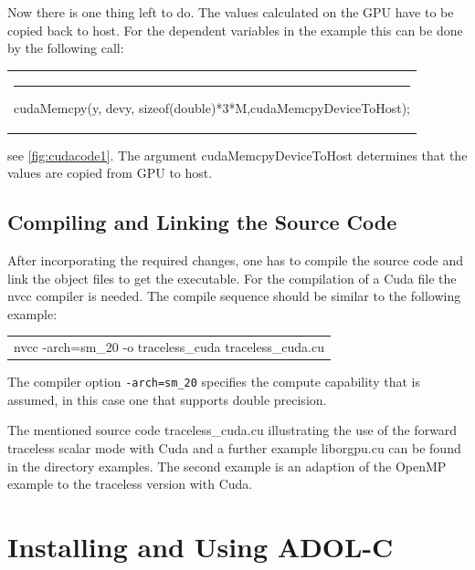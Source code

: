 \documentclass[11pt,twoside]{article}
\begin{document}
Now there is one thing left to do. The values calculated on the GPU have to be copied 
back to host. For the dependent variables in the example this can be done by the 
following call:
\begin{center}
  \begin{tabular}{l}
 {\sf \rule{0.5cm}{0pt}cudaMemcpy(y, devy, sizeof(double)*3*M,cudaMemcpyDeviceToHost);}\\
  \end{tabular}
\end{center} 
see \autoref{fig:cudacode1}. The argument {\sf cudaMemcpyDeviceToHost} determines that
the values are copied from GPU to host.

%
\subsection{Compiling and Linking the Source Code}
%
After incorporating the required changes, one has to compile the
source code and link the object files to get the executable. For 
the compilation of a Cuda file the {\sf nvcc} compiler is needed.
The compile sequence should be similar to the following example:
\begin{center}
  \begin{tabular}{l}
    {\sf nvcc -arch=sm\_20 -o traceless\_cuda traceless\_cuda.cu}
  \end{tabular}
\end{center}
The compiler option \verb#-arch=sm_20# specifies the compute capability that is 
assumed, in this case one that supports double precision.

The mentioned source code {\sf traceless\_cuda.cu} illustrating the use of the
forward traceless scalar mode with Cuda and a further example {\sf liborgpu.cu}
can be found in the directory examples. The second example is an adaption of
the OpenMP example to the traceless version with Cuda.

%
\section{Installing and Using ADOL-C}
\label{install}
%
\end{document}
